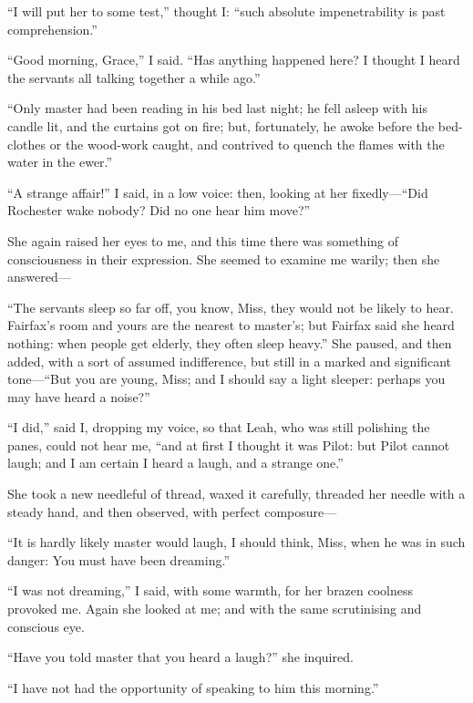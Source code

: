 \enquote{I will put her to some test,} thought I: \enquote{such absolute
	impenetrability is past comprehension.}

\enquote{Good morning, Grace,} I said.  \enquote{Has anything happened
	here?  I thought I heard the servants all talking together a while ago.}

\enquote{Only master had been reading in his bed last night; he fell
	asleep with his candle lit, and the curtains got on fire; but,
	fortunately, he awoke before the bed-clothes or the wood-work caught,
	and contrived to quench the flames with the water in the ewer.}

\enquote{A strange affair!} I said, in a low voice: then, looking at her
fixedly---\enquote{Did \Mr{} Rochester wake nobody?  Did no one hear him
	move?}

She again raised her eyes to me, and this time there was something of
consciousness in their expression.  She seemed to examine me warily;
then she answered---

\enquote{The servants sleep so far off, you know, Miss, they would not
	be likely to hear.  \Mrs{} Fairfax's room and yours are the nearest to
	master's; but \Mrs{} Fairfax said she heard nothing: when people get
	elderly, they often sleep heavy.}  She paused, and then added, with a
sort of assumed indifference, but still in a marked and significant
tone---\enquote{But you are young, Miss; and I should say a light
	sleeper: perhaps you may have heard a noise?}

\enquote{I did,} said I, dropping my voice, so that Leah, who was still
polishing the panes, could not hear me, \enquote{and at first I thought
	it was Pilot: but Pilot cannot laugh; and I am certain I heard a laugh,
	and a strange one.}

She took a new needleful of thread, waxed it carefully, threaded her
needle with a steady hand, and then observed, with perfect composure---

\enquote{It is hardly likely master would laugh, I should think, Miss,
	when he was in such danger: You must have been dreaming.}

\enquote{I was not dreaming,} I said, with some warmth, for her brazen
coolness provoked me.  Again she looked at me; and with the same
scrutinising and conscious eye.

\enquote{Have you told master that you heard a laugh?} she inquired.

\enquote{I have not had the opportunity of speaking to him this
	morning.}

